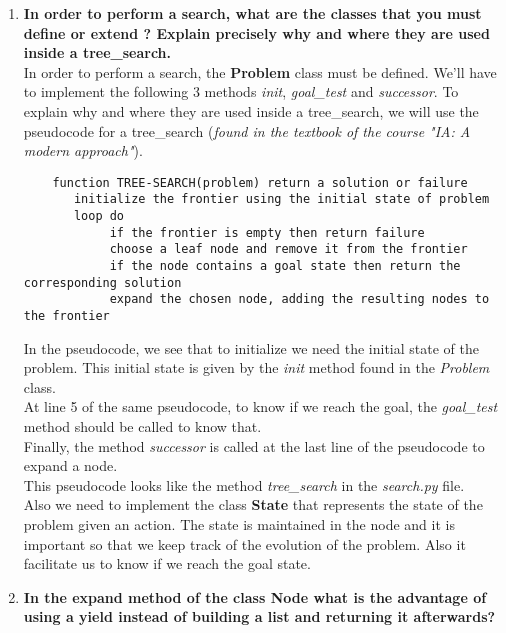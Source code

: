 \documentclass[10pt,a4paper]{article}
\begin{document}
\begin{enumerate}
	\item \textbf{In order to perform a search, what are the classes that you must define or extend ? Explain precisely why and where they are used inside a tree\_search.} \\

	
	In order to perform a search, the \textbf{Problem} class must be defined. We'll have to implement the following 3 methods  \textit{init}, \textit{goal\_test} and \textit{successor}. To explain why and where they are used inside a tree\_search, we will use the pseudocode for a tree\_search (\textit{found in the textbook of the course "IA: A modern approach"}).
	\begin{verbatim}
	function TREE-SEARCH(problem) return a solution or failure
	   initialize the frontier using the initial state of problem
	   loop do
			if the frontier is empty then return failure
			choose a leaf node and remove it from the frontier
			if the node contains a goal state then return the corresponding solution
			expand the chosen node, adding the resulting nodes to the frontier
\end{verbatim}
	
	In the pseudocode, we see that to initialize we need the initial state of the problem. This initial state is given by the \textit{init} method found in the \textit{Problem} class.\\
	At line 5 of the same pseudocode, to know if we reach the goal, the \textit{goal\_test} method should be called to know that.\\
	Finally, the method \textit{successor} is called at the last line of the pseudocode to expand a node.\\
	
	This pseudocode looks like the method \textit{tree\_search} in the \textit{search.py} file.\\
	
	Also we need to implement the class \textbf{State} that represents the state of the problem given an action. The state is maintained in the node and it is important so that we keep track of the evolution of the problem. Also it facilitate us to know if we reach the goal state. \\
	
	
	\item \textbf{In the expand method of the class Node what is the advantage of using a yield instead of building a list and returning it afterwards?} \\
	

\end{enumerate}
\end{document}
